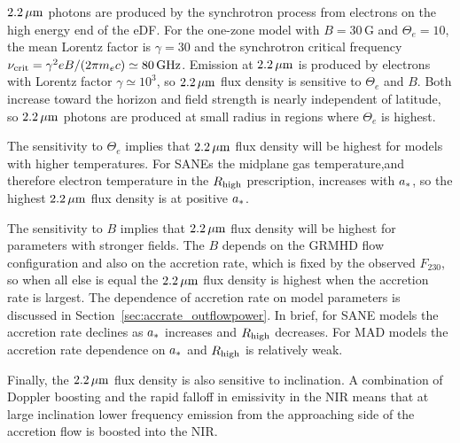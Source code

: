 
$2.2\,\mu\mathrm{m}$ photons are produced by the synchrotron process from electrons on the high energy end of the eDF.
For the one-zone model with $B = 30$\,G and $\Theta_e = 10$, the mean Lorentz factor is $\gamma = 30$ and the synchrotron critical frequency $\nu_\mathrm{crit} = \gamma^2 e B/(2 \pi m_e c) \simeq 80\,\mathrm{GHz}$.
Emission at $2.2\,\mu\mathrm{m}$ is produced by electrons with Lorentz factor $\gamma \simeq 10^3$, so $2.2\,\mu\mathrm{m}$ flux density is sensitive to $\Theta_e$ and $B$.
Both increase toward the horizon and field strength is nearly independent of latitude, so $2.2\,\mu\mathrm{m}$ photons are produced at small radius in regions where $\Theta_e$ is highest.

The sensitivity to $\Theta_e$ implies that $2.2\,\mu\mathrm{m}$ flux density will be highest for models with higher temperatures.
For SANEs the midplane gas temperature,and therefore electron temperature in the $R_\mathrm{high}$ prescription, increases with $a_*$, so the highest $2.2\,\mu\mathrm{m}$ flux density is at positive $a_*$. 

The sensitivity to $B$ implies that $2.2\,\mu\mathrm{m}$ flux density will be highest for parameters with stronger fields.
The $B$ depends on the GRMHD flow configuration and also on the accretion rate, which is fixed by the observed $F_{230}$, so when all else is equal the $2.2\,\mu\mathrm{m}$ flux density is highest when the accretion rate is largest.  The dependence of accretion rate on model parameters is discussed in Section~\ref{sec:accrate_outflowpower}.  In brief, for SANE models the accretion rate declines as $a_*$ increases and $R_\mathrm{high}$ decreases. For MAD models the accretion rate dependence on $a_*$ and $R_\mathrm{high}$ is relatively weak.

Finally, the $2.2\,\mu\mathrm{m}$ flux density is also sensitive to inclination.  A combination of Doppler boosting and the rapid falloff in emissivity in the NIR means that at large inclination lower frequency emission from the approaching side of the accretion flow is boosted into the NIR. 

